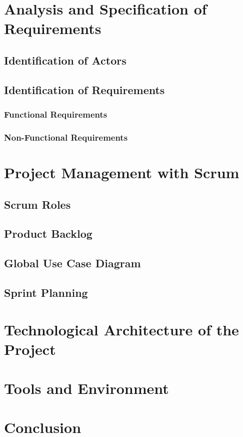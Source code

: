 \documentclass[a4paper,12pt]{report}
\begin{document}
\section{Analysis and Specification of Requirements}
\subsection{Identification of Actors}
\subsection{Identification of Requirements}
\subsubsection{Functional Requirements}
\subsubsection{Non-Functional Requirements}
\section{Project Management with Scrum}
\subsection{Scrum Roles}
\subsection{Product Backlog}
\subsection{Global Use Case Diagram}
\subsection{Sprint Planning}
\section{Technological Architecture of the Project}
\section{Tools and Environment}
\section{Conclusion}
\end{document}
